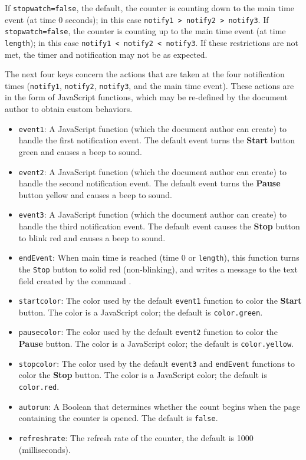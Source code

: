 \documentclass{article}
\begin{document}
If \texttt{stopwatch=false}, the default, the counter is counting down to
the main time event (at time 0 seconds); in this case \texttt{notify1 >
notify2 > notify3}. If \texttt{stopwatch=false}, the counter is counting
up to the main time event (at time \texttt{length}); in this case
\texttt{notify1 < notify2 < notify3}. If these restrictions are not met,
the timer and notification may not be as expected.

The next four keys concern the actions that are taken at the four
notification times (\texttt{notify1}, \texttt{notify2}, \texttt{notify3},
and the main time event). These actions are in the form of JavaScript
functions, which may be re-defined by the document author to obtain custom
behaviors.
\begin{itemize}
    \item \texttt{event1}: A JavaScript function (which the document
    author can create) to handle the first notification event. The default
    event turns the \textbf{Start} button green and causes a beep to sound.
    \item \texttt{event2}:  A JavaScript function (which the document
    author can create) to handle the second notification event. The default
    event turns the \textbf{Pause} button yellow and causes a beep to sound.
    \item \texttt{event3}:  A JavaScript function (which the document
    author can create) to handle the third notification event. The default
    event causes the \textbf{Stop} button to blink red and causes a beep to sound.
    \item \texttt{endEvent}: When main time is reached (time 0 or
    \texttt{length}), this function turns the \texttt{Stop} button to solid red
    (non-blinking), and writes a message to the text field created by the
    command .
    \item \texttt{startcolor}: The color used by the default \texttt{event1} function
    to color the \textbf{Start} button. The color is a JavaScript color; the
    default is \texttt{color.green}.
    \item \texttt{pausecolor}: The color used by the default \texttt{event2} function
    to color the \textbf{Pause} button. The color is a JavaScript color; the
    default is \texttt{color.yellow}.
    \item \texttt{stopcolor}: The color used by the default \texttt{event3} and
    \texttt{endEvent} functions to color the \textbf{Stop} button.
    The color is a JavaScript color; the default is \texttt{color.red}.
    \item \texttt{autorun}: A Boolean that determines whether the count
    begins when the page containing the counter is opened. The default is
    \texttt{false}.
    \item \texttt{refreshrate}: The refresh rate of the counter, the
    default is 1000 (milliseconds).
\end{itemize}
\end{document}
